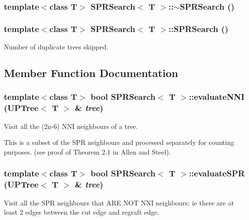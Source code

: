 \subsubsection{\setlength{\rightskip}{0pt plus 5cm}template$<$class T$>$ {\bf SPRSearch}$<$ T $>$::$\sim${\bf SPRSearch} ()}\label{classSPRSearch_a1}


\subsubsection{\setlength{\rightskip}{0pt plus 5cm}template$<$class T$>$ {\bf SPRSearch}$<$ T $>$::{\bf SPRSearch} ()\hspace{0.3cm}{\tt  [private]}}\label{classSPRSearch_d0}


Number of duplicate trees skipped. 



\subsection{Member Function Documentation}
\subsubsection{\setlength{\rightskip}{0pt plus 5cm}template$<$class T$>$ bool {\bf SPRSearch}$<$ T $>$::evaluate\-NNI ({\bf UPTree}$<$ T $>$ \& {\em tree})\hspace{0.3cm}{\tt  [protected]}}\label{classSPRSearch_b0}


Visit all the (2n-6) NNI neighbours of a tree. 

This is a subset of the SPR neighbours and processed separately for counting purposes. (see proof of Theorem 2.1 in Allen and Steel). 
\subsubsection{\setlength{\rightskip}{0pt plus 5cm}template$<$class T$>$ bool {\bf SPRSearch}$<$ T $>$::evaluate\-SPR ({\bf UPTree}$<$ T $>$ \& {\em tree})\hspace{0.3cm}{\tt  [protected]}}\label{classSPRSearch_b1}


Visit all the SPR neighbours that ARE NOT NNI neighbours: ie there are at least 2 edges between the cut edge and regraft edge. 

